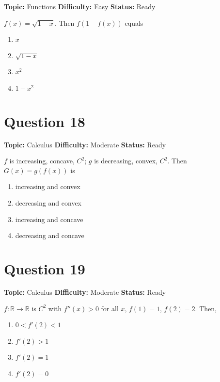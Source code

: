 \documentclass[11pt]{article}
\begin{document}

\noindent\textbf{Topic:} Functions \quad \textbf{Difficulty:} Easy \quad \textbf{Status:} Ready



$f(x) = \sqrt{1-x}$. Then $f(1 - f(x))$ equals
\begin{enumerate}[label=(\Alph*)]
\item $x$
\item $\sqrt{1-x}$
\item $x^2$
\item $1 - x^2$
\end{enumerate}

\newpage

\section*{Question 18}


\noindent\textbf{Topic:} Calculus \quad \textbf{Difficulty:} Moderate \quad \textbf{Status:} Ready



$f$ is increasing, concave, $C^2$; $g$ is decreasing, convex, $C^2$. Then $G(x) = g(f(x))$ is
\begin{enumerate}[label=(\Alph*)]
\item increasing and convex
\item decreasing and convex
\item increasing and concave
\item decreasing and concave
\end{enumerate}

\newpage

\section*{Question 19}


\noindent\textbf{Topic:} Calculus \quad \textbf{Difficulty:} Moderate \quad \textbf{Status:} Ready



$f : \mathbb R \to \mathbb R$ is $C^2$ with $f''(x) > 0$ for all $x$, $f(1)=1$, $f(2)=2$.
Then,
\begin{enumerate}[label=(\Alph*)]
\item $0 < f'(2) < 1$
\item $f'(2) > 1$
\item $f'(2) = 1$
\item $f'(2) = 0$
\end{enumerate}
\end{document}
